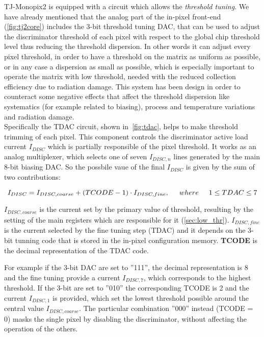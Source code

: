 TJ-Monopix2 is equipped with a circuit which allows the \textit{threshold tuning}. We have already mentioned that the analog part of the in-pixel front-end (\autoref{fig:tj2core}) includes the 3-bit threshold tuning DAC, that can be used to adjust the discriminator threshold of each pixel with respect to the global chip threshold level thus reducing the threshold dispersion. In other words it can adjust every pixel threshold, in order to have a threshold on the matrix as uniform as possible, or in any case a dispersion as small as possible, which is especially important to operate the matrix with low threshold, needed with the reduced collection efficiency due to radiation damage.  This system has been design in order to counteract some negative effects that affect the threshold dispersion like systematics (for example related to biasing), process and temperature variations and radiation damage. \\

Specifically the TDAC circuit, shown in~\autoref{fig:tdac}, helps to make threshold trimming of each pixel. This component controls the discriminator active load current $I_{DISC}$ which is partially responsible of the pixel threshold. It works as an analog multiplexer, which selects one of seven $I_{DISC, n}$ lines generated by the main 8-bit biasing DAC. So the possbile vaue of the final $I_{DISC}$ is given by the sum of two contributions:

\begin{equation}
I_{DISC} = I_{DISC, coarse} + (TCODE - 1) \cdot I_{DISC,fine},  \hspace{.5cm}	where \hspace{.5cm} 1 \leq TDAC \leq 7
\label{eq:tuning_eq}
\end{equation}

\textbf{$I_{DISC, coarse}$} is the current set by the primary value of threshold, resulting by the setting of the main registers which are responsible for it (\autoref{sec:low_thr}). 
\textbf{$I_{DISC, fine}$} is the current selected by the fine tuning step (TDAC) and it depends on the 3-bit tunning code that is stored in the in-pixel configuration memory.
\textbf{TCODE} is the decimal representation of the TDAC code. 

For example if the 3-bit DAC are set to ''111'', the decimal representation is 8 and the fine tuning provide a current $I_{DISC,7}$, which corresponds to the highest threshold. If the 3-bit are set to ''010'' the corresponding TCODE is 2 and the current $I_{DISC,1}$ is provided,  which set the lowest threshold possible around the central value $I_{DISC,coarse}$. The particular combination ''000'' instead (TCODE = 0) masks the single pixel by disabling the discriminator, without affecting the operation of the others.

